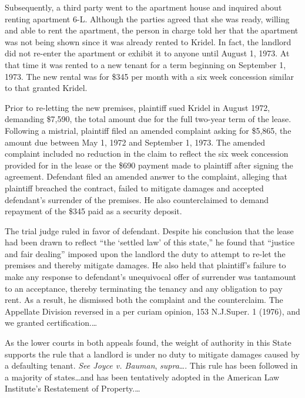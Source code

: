 Subsequently, a third party went to the apartment house and inquired about
renting apartment 6-L. Although the parties agreed that she was ready, willing
and able to rent the apartment, the person in charge told her that the
apartment was not being shown since it was already rented to Kridel. In fact,
the landlord did not re-enter the apartment or exhibit it to anyone until
August 1, 1973. At that time it was rented to a new tenant for a term beginning
on September 1, 1973. The new rental was for \$345 per month with a six week
concession similar to that granted Kridel.

Prior to re-letting the new premises, plaintiff sued Kridel in August 1972,
demanding \$7,590, the total amount due for the full two-year term of the
lease. Following a mistrial, plaintiff filed an amended complaint asking for
\$5,865, the amount due between May 1, 1972 and September 1, 1973. The amended
complaint included no reduction in the claim to reflect the six week concession
provided for in the lease or the \$690 payment made to plaintiff after signing
the agreement. Defendant filed an amended answer to the complaint, alleging
that plaintiff breached the contract, failed to mitigate damages and accepted
defendant's surrender of the premises. He also counterclaimed to demand
repayment of the \$345 paid as a security deposit.

The trial judge ruled in favor of defendant. Despite his conclusion that the
lease had been drawn to reflect ``the `settled law' of this state,'' he found
that ``justice and fair dealing'' imposed upon the landlord the duty to attempt
to re-let the premises and thereby mitigate damages. He also held that
plaintiff's failure to make any response to defendant's unequivocal offer of
surrender was tantamount to an acceptance, thereby terminating the tenancy and
any obligation to pay rent. As a result, he dismissed both the complaint and
the counterclaim. The Appellate Division reversed in a per curiam opinion, 153
N.J.Super. 1 (1976), and we granted certification.\ldots


As the lower courts in both appeals found, the weight of authority in this State
supports the rule that a landlord is under no duty to mitigate damages caused
by a defaulting tenant. \textit{See Joyce v. Bauman}, \textit{supra}\ldots.
This rule has been followed in a majority of states\ldots and has been
tentatively adopted in the American Law Institute's Restatement of
Property.\ldots

